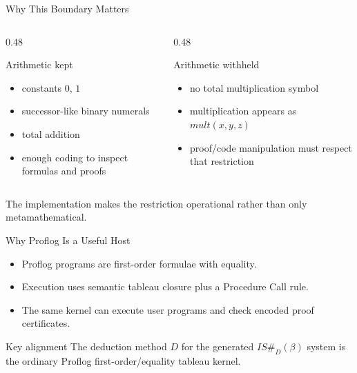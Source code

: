 \documentclass[aspectratio=169]{beamer}
\newcommand{\isdbeta}{\(IS\#_D(\beta)\)}
\begin{document}
\begin{frame}{Why This Boundary Matters}
  \begin{columns}[T,onlytextwidth]
    \begin{column}{0.48\textwidth}
      \begin{block}{Arithmetic kept}
        \begin{itemize}
          \item constants \(0\), \(1\)
          \item successor-like binary numerals
          \item total addition
          \item enough coding to inspect formulas and proofs
        \end{itemize}
      \end{block}
    \end{column}
    \begin{column}{0.48\textwidth}
      \begin{alertblock}{Arithmetic withheld}
        \begin{itemize}
          \item no total multiplication symbol
          \item multiplication appears as \(\mathit{mult}(x,y,z)\)
          \item proof/code manipulation must respect that restriction
        \end{itemize}
      \end{alertblock}
    \end{column}
  \end{columns}

  \vspace{0.8em}
  The implementation makes the restriction operational rather than only
  metamathematical.
\end{frame}

\begin{frame}{Why Proflog Is a Useful Host}
  \begin{itemize}
    \item Proflog programs are first-order formulae with equality.
    \item Execution uses semantic tableau closure plus a Procedure Call rule.
    \item The same kernel can execute user programs and check encoded proof
          certificates.
  \end{itemize}

  \vspace{0.8em}
  \begin{exampleblock}{Key alignment}
    The deduction method \(D\) for the generated \isdbeta{} system is the
    ordinary Proflog first-order/equality tableau kernel.
  \end{exampleblock}
\end{frame}
\end{document}
